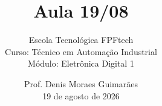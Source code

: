 
\title{Aula 19/08}

\subtitle{
\vspace{1.0cm}
Escola Tecnológica FPFtech\\
\vspace{0.5cm}
Curso: Técnico em Automação Industrial\\
\vspace{0.5cm}
Módulo: Eletrônica Digital 1
\vspace{1.0cm}
}

\author{
Prof. Denis Moraes Guimarães\\
\small 19 de agosto de 2026
}

\date{}